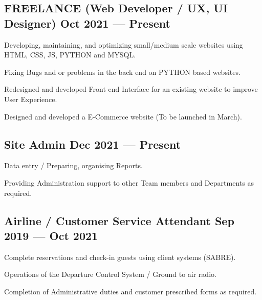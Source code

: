 \documentclass[letter,10pt]{article}
\begin{document}
\subsection{{FREELANCE (Web Developer / UX, UI Designer) \hfill Oct 2021 --- Present}}
\subtext{ \hfill}
\begin{zitemize}
\item Developing, maintaining, and optimizing small/medium scale websites using HTML, CSS, JS, PYTHON and MYSQL.
\item Fixing Bugs and or problems in the back end on PYTHON based websites.
\item Redesigned and developed Front end Interface for an existing website to improve User Experience.
\item Designed and developed a E-Commerce website (To be launched in March).
\end{zitemize}

\subsection{{Site Admin \hfill Dec 2021 --- Present}}
\begin{zitemize}
\item Data entry / Preparing, organising Reports.
\item Providing Administration support to other Team members and Departments as required.
\end{zitemize}

\subsection{{Airline / Customer Service Attendant \hfill Sep 2019 --- Oct 2021}}
\begin{zitemize}
\item Complete reservations and check-in guests using client systems (SABRE).
\item Operations of the Departure Control System / Ground to air radio.
\item Completion of Administrative duties and customer prescribed forms as required.
\end{zitemize}
\end{document}
